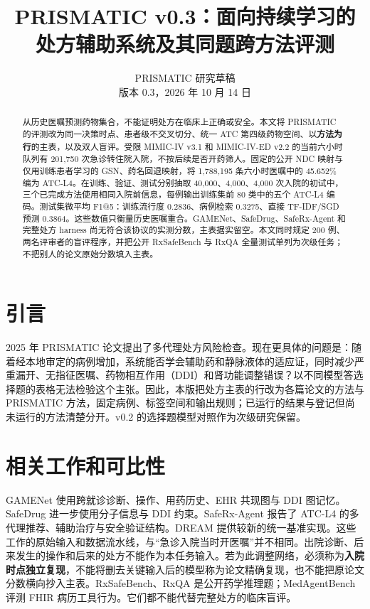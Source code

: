 \documentclass[UTF8,11pt,a4paper]{ctexart}
\title{PRISMATIC v0.3：面向持续学习的处方辅助系统及其同题跨方法评测}
\author{PRISMATIC 研究草稿\\版本 0.3，2026 年 10 月 14 日}
\date{}
\begin{document}
\maketitle
\begin{abstract}
从历史医嘱预测药物集合，不能证明处方在临床上正确或安全。本文将 PRISMATIC 的评测改为同一决策时点、患者级不交叉切分、统一 ATC 第四级药物空间、以\textbf{方法为行}的主表，以及双人盲评。受限 MIMIC-IV v3.1 和 MIMIC-IV-ED v2.2 的当前六小时队列有 201,750 次急诊转住院入院，不按后续是否开药筛人。固定的公开 NDC 映射与仅用训练患者学习的 GSN、药名回退映射，将 1,788,195 条六小时医嘱中的 45.652\% 编为 ATC-L4。在训练、验证、测试分别抽取 40,000、4,000、4,000 次入院的初试中，三个已完成方法使用相同入院前信息，每例输出训练集前 80 类中的五个 ATC-L4 编码。测试集微平均 F1@5：训练流行度 0.2836、病例检索 0.3275、直接 TF-IDF/SGD 预测 0.3864。这些数值只衡量历史医嘱重合。GAMENet、SafeDrug、SafeRx-Agent 和完整处方 harness 尚无符合该协议的实测分数，主表据实留空。本文同时规定 200 例、两名评审者的盲评程序，并把公开 RxSafeBench 与 RxQA 全量测试单列为次级任务；不把别人的论文原始分数填入主表。
\end{abstract}

\section{引言}
2025 年 PRISMATIC 论文提出了多代理处方风险检查。现在更具体的问题是：随着经本地审定的病例增加，系统能否学会辅助药和静脉液体的适应证，同时减少严重漏开、无指征医嘱、药物相互作用（DDI）和肾功能调整错误？以不同模型答选择题的表格无法检验这个主张。因此，本版把处方主表的行改为各篇论文的方法与 PRISMATIC 方法，固定病例、标签空间和输出规则；已运行的结果与登记但尚未运行的方法清楚分开。v0.2 的选择题模型对照作为次级研究保留\cite{v02}。

\section{相关工作和可比性}
GAMENet 使用跨就诊诊断、操作、用药历史、EHR 共现图与 DDI 图记忆\cite{gamenet}。SafeDrug 进一步使用分子信息与 DDI 约束\cite{safedrug}。SafeRx-Agent 报告了 ATC-L4 的多代理推荐、辅助治疗与安全验证结构\cite{saferx}。DREAM 提供较新的统一基准实现\cite{dream}。这些工作的原始输入和数据流水线，与“急诊入院当时开医嘱”并不相同。出院诊断、后来发生的操作和后来的处方不能作为本任务输入。若为此调整网络，必须称为\textbf{入院时点独立复现}，不能将删去关键输入后的模型称为论文精确复现，也不能把原论文分数横向抄入主表。RxSafeBench、RxQA 是公开药学推理题\cite{rxsafe,rxqa}；MedAgentBench 评测 FHIR 病历工具行为\cite{medagent}。它们都不能代替完整处方的临床盲评。
\end{document}
